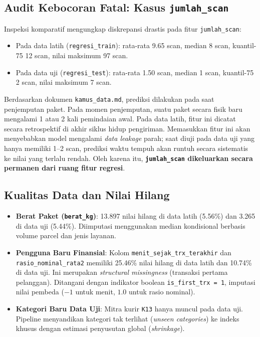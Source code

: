 \documentclass[11pt,a4paper]{article}
\begin{document}
\subsection{Audit Kebocoran Fatal: Kasus \texttt{jumlah\_scan}}
Inspeksi komparatif mengungkap diskrepansi drastis pada fitur \texttt{jumlah\_scan}:
\begin{itemize}
    \item Pada data latih (\texttt{regresi\_train}): rata-rata 9.65 scan, median 8 scan, kuantil-75 12 scan, nilai maksimum 97 scan.
    \item Pada data uji (\texttt{regresi\_test}): rata-rata 1.50 scan, median 1 scan, kuantil-75 2 scan, nilai maksimum 7 scan.
\end{itemize}
Berdasarkan dokumen \texttt{kamus\_data.md}, prediksi dilakukan pada saat penjemputan paket. Pada momen penjemputan, suatu paket secara fisik baru mengalami 1 atau 2 kali pemindaian awal. Pada data latih, fitur ini dicatat secara retrospektif di akhir siklus hidup pengiriman. Memasukkan fitur ini akan menyebabkan model mengalami \textit{data leakage} parah; saat diuji pada data uji yang hanya memiliki 1--2 scan, prediksi waktu tempuh akan runtuh secara sistematis ke nilai yang terlalu rendah. Oleh karena itu, \textbf{\texttt{jumlah\_scan} dikeluarkan secara permanen dari ruang fitur regresi}.

\subsection{Kualitas Data dan Nilai Hilang}
\begin{itemize}
    \item \textbf{Berat Paket (\texttt{berat\_kg})}: 13.897 nilai hilang di data latih (5.56\%) dan 3.265 di data uji (5.44\%). Diimputasi menggunakan median kondisional berbasis volume parcel dan jenis layanan.
    \item \textbf{Pengguna Baru Finansial}: Kolom \texttt{menit\_sejak\_trx\_terakhir} dan \texttt{rasio\_nominal\_rata2} memiliki 25.46\% nilai hilang di data latih dan 10.74\% di data uji. Ini merupakan \textit{structural missingness} (transaksi pertama pelanggan). Ditangani dengan indikator boolean \texttt{is\_first\_trx = 1}, imputasi nilai pembeda ($-1$ untuk menit, $1.0$ untuk rasio nominal).
    \item \textbf{Kategori Baru Data Uji}: Mitra kurir \texttt{K13} hanya muncul pada data uji. Pipeline menyandikan kategori tak terlihat (\textit{unseen categories}) ke indeks khusus dengan estimasi penyusutan global (\textit{shrinkage}).
\end{itemize}
\end{document}
